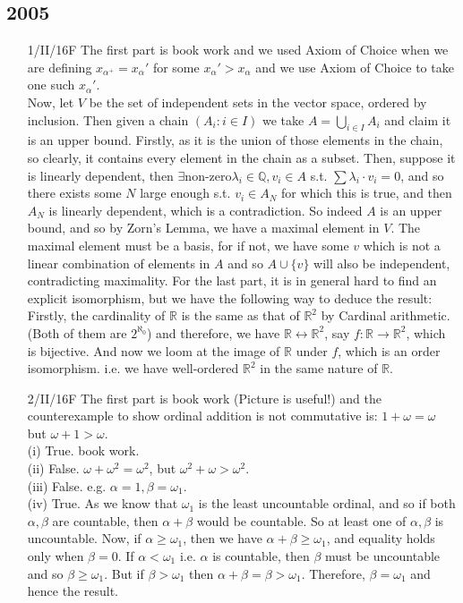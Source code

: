 \subsection{2005}
\begin{enumerate}
\item[1/II/16F] The first part is book work and we used Axiom of Choice when we are defining $x_{\alpha^+}=x_\alpha'$ for some $x_\alpha' > x_\alpha$ and we use Axiom of Choice to take one such $x_\alpha'$.\\
    Now, let $V$ be the set of independent sets in the vector space, ordered by inclusion. Then given a chain $(A_i: i \in I)$ we take $A = \bigcup_{i \in I}A_i$ and claim it is an upper bound. Firstly, as it is the union of those elements in the chain, so clearly, it contains every element in the chain as a subset. Then, suppose it is linearly dependent, then $\exists $non-zero$ \lambda_i \in \mathbb{Q}, v_i \in A$ s.t. $\sum \lambda_i \cdot v_i =0$, and so there exists some $N$ large enough s.t. $v_i \in A_N$ for which this is true, and then $A_N$ is linearly dependent, which is a contradiction. So indeed $A$ is an upper bound, and so by Zorn's Lemma, we have a maximal element in $V$. The maximal element must be a basis, for if not, we have some $v$ which is not a linear combination of elements in $A$ and so $A \cup \{v\}$ will also be independent, contradicting maximality. For the last part, it is in general hard to find an explicit isomorphism, but we have the following way to deduce the result: Firstly, the cardinality of $\mathbb{R}$ is the same as that of $\mathbb{R}^2$ by Cardinal arithmetic. (Both of them are $2^{\aleph_0}$) and therefore, we have $\mathbb{R} \leftrightarrow \mathbb{R}^2$, say $f: \mathbb{R} \rightarrow \mathbb{R}^2$, which is bijective. And now we loom at the image of $\mathbb{R}$ under $f$, which is an order isomorphism. i.e. we have well-ordered $\mathbb{R}^2$ in the same nature of $\mathbb{R}$.\\
\item[2/II/16F] The first part is book work (Picture is useful!) and the counterexample to show ordinal addition is not commutative is: $1+ \omega = \omega$ but $\omega+1 >\omega$.\\
    (i) True. book work.\\
    (ii) False. $\omega+\omega^2=\omega^2$, but $\omega^2 +\omega > \omega^2$.\\
    (iii) False. e.g. $\alpha=1, \beta=\omega_1$.\\
    (iv) True. As we know that $\omega_1$ is the least uncountable ordinal, and so if both $\alpha,\beta$ are countable, then $\alpha+\beta$ would be countable. So at least one of $\alpha, \beta$ is uncountable. Now, if $\alpha \ge \omega_1$, then we have $\alpha + \beta \ge \omega_1$, and equality holds only when $\beta=0$. If $\alpha < \omega_1$ i.e. $\alpha$ is countable, then $\beta$ must be uncountable and so $\beta \ge \omega_1$. But if $\beta > \omega_1$ then $\alpha+\beta=\beta > \omega_1$. Therefore, $\beta=\omega_1$ and hence the result.\\

\end{enumerate}
